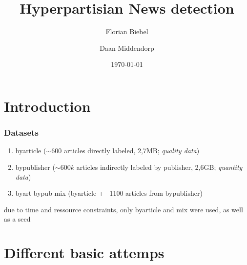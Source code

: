 \documentclass{beamer}
\begin{document}
\title{Hyperpartisian News detection}   
\author{Florian Biebel \and Daan Middendorp} 
\date{\today} 

\frame{\titlepage} 




\section{Introduction}


\begin{frame}
    \frametitle{Datasets}
    \begin{enumerate}
        \item byarticle ($\sim600$ articles directly labeled, 2,7MB; \emph{quality data})
        \item bypublisher ($\sim600k$ articles indirectly labeled by publisher, 2,6GB; \emph{quantity data})
        \item byart-bypub-mix (byarticle + ~1100 articles from bypublisher)
    \end{enumerate}
    due to time and ressource constraints, only byarticle and mix were used, as well as a seed
\end{frame}

\section{Different basic attemps}
\end{document}
